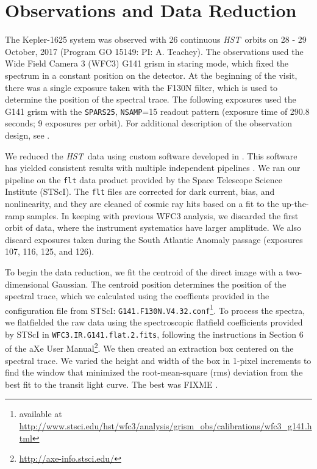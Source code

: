 \documentclass[twocolumn]{aastex62}
\newcommand{\project}[1]{\textsl{#1}}
\newcommand{\HST}{\project{HST}}
\begin{document}


\section{Observations and Data Reduction} \label{sec:data}
The Kepler-1625 system was observed with 26 continuous \HST\ orbits on 28 - 29 October, 2017 (Program GO 15149: PI: A. Teachey). The observations used the Wide Field Camera 3 (WFC3) G141 grism in staring mode, which fixed the spectrum in a constant position on the detector.  At the beginning of the visit, there was a single exposure taken with the F130N filter, which is used to determine the position of the spectral trace. The following exposures used the G141 grism with the \texttt{SPARS25}, \texttt{NSAMP}=15 readout pattern (exposure time of 290.8 seconds; 9 exposures per orbit). For additional description of the observation design, see \cite{teachey18b}.  


We reduced the \HST\ data using custom software developed in \cite{kreidberg14a}.  This software has yielded consistent results with multiple independent pipelines \citep[e.g.][]{knutson14b, spake18}.  We ran our pipeline on the \texttt{flt} data product provided by the Space Telescope Science Institute (STScI). The \texttt{flt} files are corrected for dark current, bias, and nonlinearity, and they are cleaned of cosmic ray hits based on a fit to the up-the-ramp samples. In keeping with previous WFC3 analysis, we discarded the first orbit of data, where the instrument systematics have larger amplitude. We also discard exposures taken during the South Atlantic Anomaly passage (exposures 107, 116, 125, and 126).

To begin the data reduction, we fit the centroid of the direct image with a two-dimensional Gaussian. The centroid position determines the position of the spectral trace, which we calculated using the coeffients provided in the configuration file from STScI: \texttt{G141.F130N.V4.32.conf}\footnote{available at \url{http://www.stsci.edu/hst/wfc3/analysis/grism_obs/calibrations/wfc3_g141.html}}.  To process the spectra, we flatfielded the raw data using the spectroscopic flatfield coefficients provided by STScI in \texttt{WFC3.IR.G141.flat.2.fits}, following the instructions in Section 6 of the aXe User Manual\footnote{\url{http://axe-info.stsci.edu/}}.  We then created an extraction box centered on the spectral trace. We varied the height and width of the box in 1-pixel increments to find the window that minimized the root-mean-square (rms) deviation from the best fit to the transit light curve. The best was FIXME . 
\end{document}
